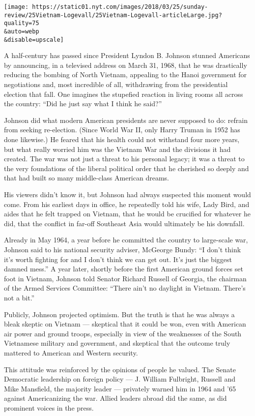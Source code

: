 \texttt{[image: https://static01.nyt.com/images/2018/03/25/sunday-review/25Vietnam-Logevall/25Vietnam-Logevall-articleLarge.jpg?quality=75\\\&auto=webp\\\&disable=upscale]}

A half-century has passed since President Lyndon B. Johnson stunned
Americans by announcing, in a televised address on March 31, 1968, that
he was drastically reducing the bombing of North Vietnam, appealing to
the Hanoi government for negotiations and, most incredible of all,
withdrawing from the presidential election that fall. One imagines the
stupefied reaction in living rooms all across the country: ``Did he just
say what I think he said?''

Johnson did what modern American presidents are never supposed to do:
refrain from seeking re-election. (Since World War II, only Harry Truman
in 1952 has done likewise.) He feared that his health could not
withstand four more years, but what really worried him was the Vietnam
War and the divisions it had created. The war was not just a threat to
his personal legacy; it was a threat to the very foundations of the
liberal political order that he cherished so deeply and that had built
so many middle-class American dreams.

His viewers didn't know it, but Johnson had always suspected this moment
would come. From his earliest days in office, he repeatedly told his
wife, Lady Bird, and aides that he felt trapped on Vietnam, that he
would be crucified for whatever he did, that the conflict in far-off
Southeast Asia would ultimately be his downfall.

Already in May 1964, a year before he committed the country to
large-scale war, Johnson said to his national security adviser, McGeorge
Bundy: ``I don't think it's worth fighting for and I don't think we can
get out. It's just the biggest damned mess.'' A year later, shortly
before the first American ground forces set foot in Vietnam, Johnson
told Senator Richard Russell of Georgia, the chairman of the Armed
Services Committee: ``There ain't no daylight in Vietnam. There's not a
bit.''

Publicly, Johnson projected optimism. But the truth is that he was
always a bleak skeptic on Vietnam --- skeptical that it could be won,
even with American air power and ground troops, especially in view of
the weaknesses of the South Vietnamese military and government, and
skeptical that the outcome truly mattered to American and Western
security.

This attitude was reinforced by the opinions of people he valued. The
Senate Democratic leadership on foreign policy --- J. William Fulbright,
Russell and Mike Mansfield, the majority leader --- privately warned him
in 1964 and '65 against Americanizing the war. Allied leaders abroad did
the same, as did prominent voices in the press.

